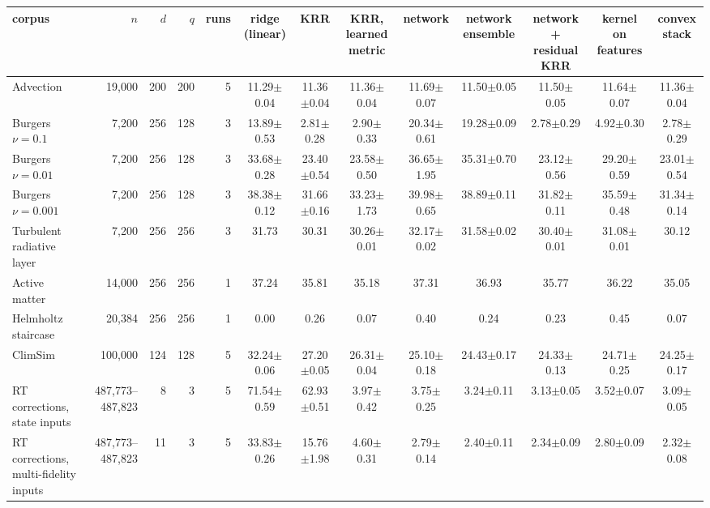 \begin{tabular}{lrrrrcccccccc}
\toprule
corpus & $n$ & $d$ & $q$ & runs & ridge (linear) & KRR & KRR, learned metric & network & network ensemble & network + residual KRR & kernel on features & convex stack \\
\midrule
Advection & 19,000 & 200 & 200 & 5 & 11.29$\pm$0.04 & 11.36$\pm$0.04 & 11.36$\pm$0.04 & 11.69$\pm$0.07 & 11.50$\pm$0.05 & 11.50$\pm$0.05 & 11.64$\pm$0.07 & 11.36$\pm$0.04 \\
Burgers $\nu=0.1$ & 7,200 & 256 & 128 & 3 & 13.89$\pm$0.53 & 2.81$\pm$0.28 & 2.90$\pm$0.33 & 20.34$\pm$0.61 & 19.28$\pm$0.09 & 2.78$\pm$0.29 & 4.92$\pm$0.30 & 2.78$\pm$0.29 \\
Burgers $\nu=0.01$ & 7,200 & 256 & 128 & 3 & 33.68$\pm$0.28 & 23.40$\pm$0.54 & 23.58$\pm$0.50 & 36.65$\pm$1.95 & 35.31$\pm$0.70 & 23.12$\pm$0.56 & 29.20$\pm$0.59 & 23.01$\pm$0.54 \\
Burgers $\nu=0.001$ & 7,200 & 256 & 128 & 3 & 38.38$\pm$0.12 & 31.66$\pm$0.16 & 33.23$\pm$1.73 & 39.98$\pm$0.65 & 38.89$\pm$0.11 & 31.82$\pm$0.11 & 35.59$\pm$0.48 & 31.34$\pm$0.14 \\
Turbulent radiative layer & 7,200 & 256 & 256 & 3 & 31.73 & 30.31 & 30.26$\pm$0.01 & 32.17$\pm$0.02 & 31.58$\pm$0.02 & 30.40$\pm$0.01 & 31.08$\pm$0.01 & 30.12 \\
Active matter & 14,000 & 256 & 256 & 1 & 37.24 & 35.81 & 35.18 & 37.31 & 36.93 & 35.77 & 36.22 & 35.05 \\
Helmholtz staircase & 20,384 & 256 & 256 & 1 & 0.00 & 0.26 & 0.07 & 0.40 & 0.24 & 0.23 & 0.45 & 0.07 \\
ClimSim & 100,000 & 124 & 128 & 5 & 32.24$\pm$0.06 & 27.20$\pm$0.05 & 26.31$\pm$0.04 & 25.10$\pm$0.18 & 24.43$\pm$0.17 & 24.33$\pm$0.13 & 24.71$\pm$0.25 & 24.25$\pm$0.17 \\
RT corrections, state inputs & 487,773--487,823 & 8 & 3 & 5 & 71.54$\pm$0.59 & 62.93$\pm$0.51 & 3.97$\pm$0.42 & 3.75$\pm$0.25 & 3.24$\pm$0.11 & 3.13$\pm$0.05 & 3.52$\pm$0.07 & 3.09$\pm$0.05 \\
RT corrections, multi-fidelity inputs & 487,773--487,823 & 11 & 3 & 5 & 33.83$\pm$0.26 & 15.76$\pm$1.98 & 4.60$\pm$0.31 & 2.79$\pm$0.14 & 2.40$\pm$0.11 & 2.34$\pm$0.09 & 2.80$\pm$0.09 & 2.32$\pm$0.08 \\
\bottomrule
\end{tabular}
